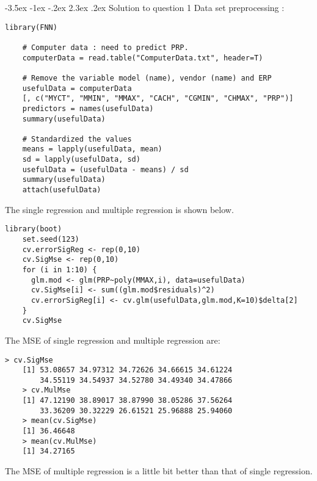 \documentclass[12pt]{article}
\makeatletter
\renewcommand\section{\@startsection {section}{1}{\z@}%
	{-3.5ex \@plus -1ex \@minus -.2ex}%
	{2.3ex \@plus.2ex}%
	{\normalfont\large\bfseries}}%
\makeatother
\begin{document}
	\section{Solution to question 1}
	Data set preprocessing :\\
	\lstset{language=R}
	\lstset{frame=lines}
	\lstset{basicstyle=\footnotesize\ttfamily}
	\begin{lstlisting}[breaklines=true]
	library(FNN)
	
	# Computer data : need to predict PRP.
	computerData = read.table("ComputerData.txt", header=T)
	
	# Remove the variable model (name), vendor (name) and ERP
	usefulData = computerData
	[, c("MYCT", "MMIN", "MMAX", "CACH", "CGMIN", "CHMAX", "PRP")]
	predictors = names(usefulData)
	summary(usefulData)
	
	# Standardized the values
	means = lapply(usefulData, mean)
	sd = lapply(usefulData, sd)
	usefulData = (usefulData - means) / sd
	summary(usefulData)
	attach(usefulData)
	\end{lstlisting}
	The single regression and multiple regression is shown below.\\
	\lstset{language=R}
	\lstset{frame=lines}
	\lstset{basicstyle=\footnotesize\ttfamily}
	\begin{lstlisting}[breaklines=true]
	library(boot)
	set.seed(123)
	cv.errorSigReg <- rep(0,10)
	cv.SigMse <- rep(0,10)
	for (i in 1:10) {
	  glm.mod <- glm(PRP~poly(MMAX,i), data=usefulData)
	  cv.SigMse[i] <- sum((glm.mod$residuals)^2)
	  cv.errorSigReg[i] <- cv.glm(usefulData,glm.mod,K=10)$delta[2]
	}
	cv.SigMse
	\end{lstlisting}
	The MSE of single regression and multiple regression are:\\	
	\lstset{language=R}
	\lstset{frame=lines}
	\lstset{basicstyle=\footnotesize\ttfamily}
	\begin{lstlisting}[breaklines=true]
	> cv.SigMse
	[1] 53.08657 34.97312 34.72626 34.66615 34.61224 
        34.55119 34.54937 34.52780 34.49340 34.47866
	> cv.MulMse
	[1] 47.12190 38.89017 38.87990 38.05286 37.56264 
	    33.36209 30.32229 26.61521 25.96888 25.94060
	> mean(cv.SigMse)
	[1] 36.46648
	> mean(cv.MulMse)
	[1] 34.27165
	\end{lstlisting}
	The MSE of multiple regression is a little bit better than that of single regression.
\end{document}
